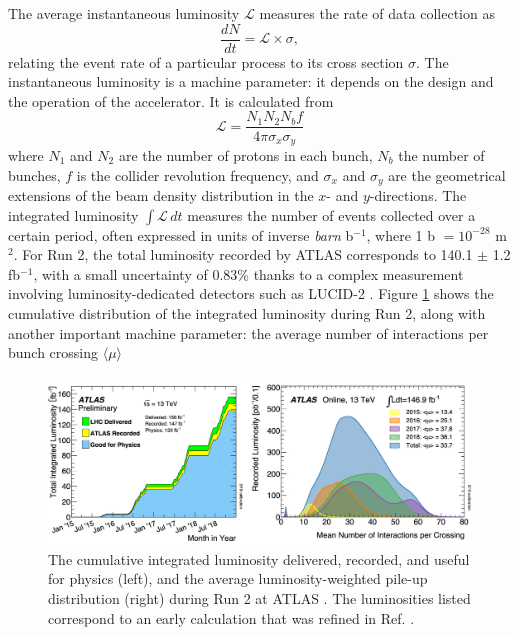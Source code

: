 The average instantaneous luminosity $\mathcal{L}$ measures the rate of data collection as
\begin{equation}
  \frac{dN}{dt} = \mathcal{L} \times \sigma,
\end{equation}
relating the event rate of a particular process to its cross section $\sigma$. The instantaneous luminosity is a machine parameter: it depends on the design and the operation of the accelerator. It is calculated from
\begin{equation}
  \mathcal{L} = \frac{N_1N_2N_bf}{4\pi\sigma_x\sigma_y}
\end{equation}
where $N_1$ and $N_2$ are the number of protons in each bunch, $N_b$ the number of bunches, $f$ is the collider revolution frequency, and $\sigma_x$ and $\sigma_y$ are the geometrical extensions of the beam density distribution in the $x$- and $y$-directions. The integrated luminosity $\int \mathcal{L}\, dt$ measures the number of events collected over a certain period, often expressed in units of inverse \textit{barn} b$^{-1}$, where 1 b $= 10^{-28}$ m$^{2}$. For Run 2, the total luminosity recorded by ATLAS corresponds to 140.1 $\pm$ 1.2 fb$^{-1}$, with a small uncertainty of 0.83\% \cite{ATLAS:2022hro} thanks to a complex measurement involving luminosity-dedicated detectors such as LUCID-2 \cite{Avoni_2018}. Figure \ref{fig-atlasLumiPileup} shows the cumulative distribution of the integrated luminosity during Run 2, along with another important machine parameter: the average number of interactions per bunch crossing $\langle \mu\rangle$

\begin{figure}[!h]
  \centering
  \includegraphics[width=\textwidth]{Images/ATLAS/recoATLAS.png}
  \caption{The cumulative integrated luminosity delivered, recorded, and useful for physics (left), and the average luminosity-weighted pile-up distribution (right) during Run 2 at ATLAS \cite{PubAtlasLumi}. The luminosities listed correspond to an early calculation that was refined in Ref. \cite{ATLAS:2022hro}.}
  \label{fig-atlasLumiPileup}
\end{figure}

